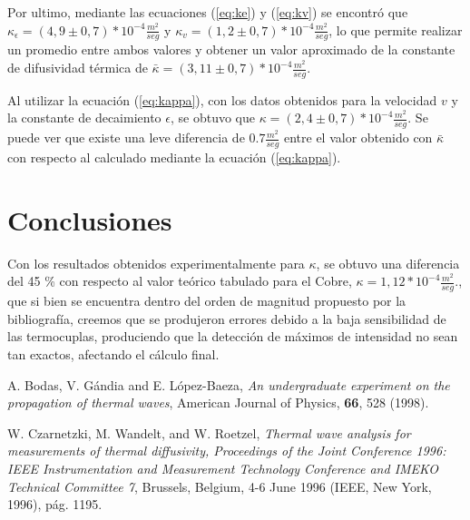 \documentclass[twoside,twocolumn,a4paper]{article}
\begin{document}
Por ultimo, mediante las ecuaciones (\ref{eq:ke}) y (\ref{eq:kv}) se encontr\'o que $\kappa_{\epsilon} = (4,9 \pm 0,7) * 10^{-4} \frac{m^{2}}{seg}$ y $\kappa_{v} = (1,2 \pm 0,7) * 10^{-4} \frac{m^{2}}{seg}$, lo que permite realizar un promedio entre ambos valores y obtener un valor aproximado de la constante de difusividad t\'ermica de $\bar{\kappa} = (3,11 \pm 0,7) * 10^{-4}  \frac{m^{2}}{seg}$.

Al utilizar la ecuaci\'on (\ref{eq:kappa}), con los datos obtenidos para la velocidad $v$ y la constante de decaimiento $\epsilon$, se obtuvo que $\kappa = (2,4 \pm 0,7) * 10^{-4} \frac{m^{2}}{seg}$. Se puede ver que existe una leve diferencia de $0.7\frac{m^{2}}{seg}$ entre el valor obtenido con $\bar{\kappa}$ con respecto al calculado mediante la ecuaci\'on (\ref{eq:kappa}).


\section{Conclusiones}




\par
Con los resultados obtenidos experimentalmente para $\kappa$, se obtuvo una diferencia del 45 \% con respecto al valor te\'orico tabulado para el Cobre, $\kappa = 1,12 * 10^{-4} \frac{m^{2}}{seg}$., que si bien se encuentra dentro del orden de magnitud propuesto por la bibliograf\'ia, creemos que se produjeron errores debido a la baja sensibilidad de las termocuplas, produciendo que la detecci\'on de m\'aximos de intensidad no sean tan exactos, afectando el c\'alculo final.



\newpage
\begin{thebibliography}{99} %


 A. Bodas, V. G\'andia and E. L\'opez-Baeza, \textit{An undergraduate experiment on the propagation of thermal waves}, American Journal of Physics, \textbf{66}, 528 (1998).

 W. Czarnetzki, M. Wandelt, and W. Roetzel, \textit{Thermal wave analysis for measurements of thermal diffusivity, Proceedings of the Joint Conference 1996: IEEE Instrumentation and Measurement Technology Conference and IMEKO Technical Committee 7}, Brussels, Belgium, 4-6 June 1996 (IEEE, New York, 1996), p\'ag. 1195.
 
\end{thebibliography}


\end{document}
